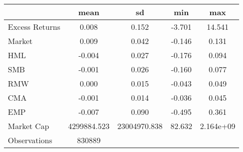 {
\def\sym#1{\ifmmode^{#1}\else\(^{#1}\)\fi}
\begin{tabular}{l*{1}{cccc}}
\hline\hline
                    &        mean&          sd&         min&         max\\
\hline
Excess Returns      &       0.008&       0.152&      -3.701&      14.541\\
Market              &       0.009&       0.042&      -0.146&       0.131\\
HML                 &      -0.004&       0.027&      -0.176&       0.094\\
SMB                 &      -0.001&       0.026&      -0.160&       0.077\\
RMW                 &       0.000&       0.015&      -0.043&       0.049\\
CMA                 &      -0.001&       0.014&      -0.036&       0.045\\
EMP                 &      -0.007&       0.090&      -0.495&       0.361\\
Market Cap          & 4299884.523&23004970.838&      82.632&   2.164e+09\\
\hline
Observations        &      830889&            &            &            \\
\hline\hline
\end{tabular}
}
